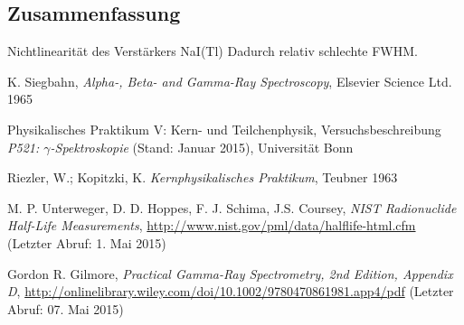 \documentclass[11pt, a4paper]{article}
\numberwithin{equation}{section}
\begin{document}
\subsection{Zusammenfassung}
Nichtlinearität des Verstärkers NaI(Tl)
Dadurch relativ schlechte FWHM.


\FloatBarrier
\vspace{\fill}
\begin{thebibliography}{19}
	K. Siegbahn,
	\emph{Alpha-, Beta- and Gamma-Ray Spectroscopy},
	Elsevier Science Ltd. 1965

	Physikalisches Praktikum V: Kern- und Teilchenphysik,
	Versuchsbeschreibung \emph{P521: $\gamma$-Spektroskopie} (Stand: Januar 2015),
	Universität Bonn	

	Riezler, W.; Kopitzki, K.
	\emph{Kernphysikalisches Praktikum},
	Teubner 1963

	M. P. Unterweger, D. D. Hoppes, F. J. Schima, J.S. Coursey,
	\emph{NIST Radionuclide Half-Life Measurements},
	\url{http://www.nist.gov/pml/data/halflife-html.cfm} (Letzter Abruf: 1. Mai 2015)
	
	Gordon R. Gilmore,
	\emph{Practical Gamma-Ray Spectrometry, 2nd Edition, Appendix D},
	\url{http://onlinelibrary.wiley.com/doi/10.1002/9780470861981.app4/pdf} (Letzter Abruf: 07. Mai 2015)

\end{thebibliography}
\end{document}

